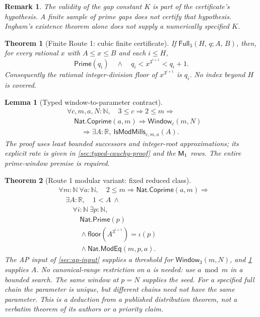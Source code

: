\documentclass[11pt,reqno]{amsart}
\newcommand{\N}{\mathbb N}
\newcommand{\R}{\mathbb R}
\newcommand{\Prime}{\textsf{Prime}}
\newcommand{\floor}{\textsf{floor}}
\theoremstyle{blueplain}
\newtheorem{theorem}{Theorem}[section]
\newtheorem{lemma}{Lemma}[section]
\newtheorem{remark}{Remark}[section]
\newcounter{type}
\providecommand{\comma}{\allowbreak,\,}
\numberwithin{equation}{section}
\newcommand{\Full}{\textsf{Full}}
\begin{document}
\begin{remark}
The validity of the gap constant \(K\) is part of the certificate's hypothesis.
A finite sample of prime gaps does not certify that hypothesis. Ingham's
existence theorem alone does not supply a numerically specified \(K\).
\end{remark}
\begin{theorem}[Finite Route 1: cubic finite certificate]\label{fin:thm:mills}
If \(\Full_3(H\comma q;A\comma B)\), then, for every rational \(x\) with
\(A\le x\le B\) and each \(i\le H\),
\[
\Prime(q_i)\quad\wedge\quad q_i<x^{3^{i+1}}<q_i+1.
\]
Consequently the rational integer-division floor of \(x^{3^{i+1}}\)
is \(q_i\). No index beyond \(H\) is covered.
\end{theorem}


\begin{lemma}[Typed window-to-parameter contract]\label{lem:typed-window-limit}
\[
\begin{aligned}
&\forall c,m,a,N:\N,\quad 3\le c\Rightarrow2\le m\Rightarrow\\
&\quad\textsf{Nat.Coprime}(a,m)\Rightarrow\textsf{Window}_c(m,N)\\
&\qquad\Rightarrow\exists A:\R,\ \textsf{IsModMills}_{c,m,a}(A).
\end{aligned}
\]
The proof uses least bounded successors and integer-root approximations;
its explicit rate is given in \cref{sec:typed-cauchy-proof} and the
$\textsf M_1$ rows. The entire prime-window premise is required.
\end{lemma}

\begin{theorem}[Route 1 modular variant: fixed reduced class]\label{thm:mod-global}
\[
\begin{aligned}
&\forall m:\N\ \forall a:\N,\quad
2\le m\Rightarrow\textsf{Nat.Coprime}(a,m)\Rightarrow\\
&\quad\exists A:\R,\quad1<A\ \wedge\\
&\qquad\forall i:\N\ \exists p:\N,\\
&\qquad\quad\textsf{Nat.Prime}(p)\\
&\qquad\quad{}\wedge\floor(A^{3^{i+1}})=\iota(p)\\
&\qquad\quad{}\wedge\textsf{Nat.ModEq}(m,p,a).
\end{aligned}
\]
The AP input of \cref{sec:ap-input} supplies a threshold for
$\textsf{Window}_3(m,N)$, and \cref{lem:typed-window-limit} supplies $A$.
No canonical-range restriction on $a$ is needed: use $a\bmod m$ in a
bounded search. The same window at $p=N$ supplies the seed. For a specified
full chain the parameter is unique, but different chains need not have the
same parameter. This is a deduction from a published distribution theorem,
not a verbatim theorem of its authors or a priority claim.
\end{theorem}
\end{document}
